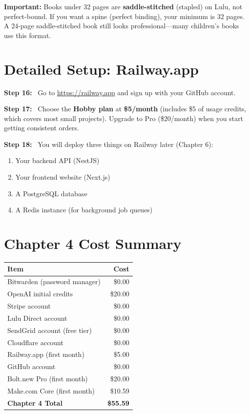 \documentclass[12pt, letterpaper, oneside]{book}
\newcommand{\cost}[1]{\textcolor{money}{\textbf{#1}}}
\newcommand{\step}[1]{\noindent\textbf{\textcolor{primary}{Step #1:}}~}
\begin{document}
\begin{infobox}
\textbf{Important:} Books under 32 pages are \textbf{saddle-stitched} (stapled) on Lulu, not perfect-bound. If you want a spine (perfect binding), your minimum is 32 pages. A 24-page saddle-stitched book still looks professional---many children's books use this format.
\end{infobox}

\section{Detailed Setup: Railway.app}

\step{16} Go to \url{https://railway.app} and sign up with your GitHub account.

\step{17} Choose the \textbf{Hobby plan} at \cost{\$5/month} (includes \$5 of usage credits, which covers most small projects). Upgrade to Pro (\$20/month) when you start getting consistent orders.

\step{18} You will deploy three things on Railway later (Chapter 6):
\begin{enumerate}[leftmargin=2em]
  \item Your backend API (NestJS)
  \item Your frontend website (Next.js)
  \item A PostgreSQL database
  \item A Redis instance (for background job queues)
\end{enumerate}

\section{Chapter 4 Cost Summary}

\begin{table}[H]
\centering
\begin{tabular}{lr}
\toprule
\textbf{Item} & \textbf{Cost} \\
\midrule
Bitwarden (password manager) & \$0.00 \\
OpenAI initial credits & \$20.00 \\
Stripe account & \$0.00 \\
Lulu Direct account & \$0.00 \\
SendGrid account (free tier) & \$0.00 \\
Cloudflare account & \$0.00 \\
Railway.app (first month) & \$5.00 \\
GitHub account & \$0.00 \\
Bolt.new Pro (first month) & \$20.00 \\
Make.com Core (first month) & \$10.59 \\
\midrule
\textbf{Chapter 4 Total} & \textbf{\$55.59} \\
\bottomrule
\end{tabular}
\end{table}
\end{document}
